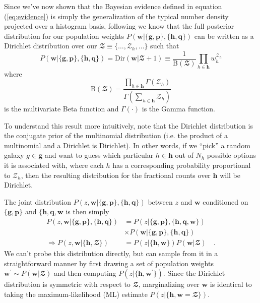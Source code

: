 \documentclass[a4paper,fleqn,usenatbib,english]{mnras}
\begin{document}
Since we've now shown that the Bayesian evidence defined in equation (\ref{eq:evidence}) is simply the generalization of the typical number density projected over a histogram basis, following \citep{leistedt+16} we know that the full posterior distribution for our population weights $P(\mathbf{w}|\lbrace \mathbf{g}, \mathbf{p} \rbrace, \lbrace \mathbf{h},\mathbf{q} \rbrace)$ can be written as a Dirichlet distribution over our $\mathbfcal{Z} \equiv \lbrace \ldots, \mathcal{Z}_h , \ldots \rbrace$ such that
\begin{equation}\label{eq:wh_pop}
P(\mathbf{w}|\lbrace \mathbf{g}, \mathbf{p} \rbrace, \lbrace \mathbf{h},\mathbf{q} \rbrace) = \textrm{Dir}(\mathbf{w}|\mathbfcal{Z}+1) \equiv \frac{1}{\textrm{B}(\mathbfcal{Z})} \prod_{h \in \mathbf{h}} w_h^{\mathcal{Z}_h}
\end{equation}
where
\begin{equation}
\textrm{B}(\mathbfcal{Z})=\frac{\prod_{h \in \mathbf{h}} \Gamma(\mathcal{Z}_h)}{\Gamma\left(\sum_{h \in \mathbf{h}} \mathcal{Z}_h \right)}
\end{equation}
is the multivariate Beta function and $\Gamma(\cdot)$ is the Gamma function.

To understand this result more intuitively, note that the Dirichlet distribution is the conjugate prior of the multinomial distribution (i.e. the product of a multinomial and a Dirichlet is Dirichlet). In other words, if we ``pick'' a random galaxy $g \in \mathbf{g}$ and want to guess which particular $h \in \mathbf{h}$ out of $N_h$ possible options it is associated with, where each $h$ has a corresponding probability proportional to $\mathcal{Z}_h$, then the resulting distribution for the fractional counts over $\mathbf{h}$ will be Dirichlet.

The joint distribution $P(z,\mathbf{w}|\lbrace \mathbf{g}, \mathbf{p} \rbrace, \lbrace \mathbf{h},\mathbf{q} \rbrace)$ between $z$ and $\mathbf{w}$ conditioned on $\lbrace \mathbf{g}, \mathbf{p} \rbrace$ and $\lbrace \mathbf{h}, \mathbf{q}, \mathbf{w}$ is then simply
\begin{align}
P(z,\mathbf{w}|\lbrace \mathbf{g}, \mathbf{p} \rbrace, \lbrace \mathbf{h},\mathbf{q} \rbrace) &= P(z|\lbrace \mathbf{g}, \mathbf{p} \rbrace, \lbrace \mathbf{h},\mathbf{q},\mathbf{w} \rbrace) \nonumber \\ 
&\times P(\mathbf{w}|\lbrace \mathbf{g},\mathbf{p} \rbrace, \lbrace \mathbf{h},\mathbf{q} \rbrace) \nonumber \\
\Rightarrow P(z,\mathbf{w}|\lbrace \mathbf{h},\mathbfcal{Z} \rbrace) &= P(z|\lbrace \mathbf{h}, \mathbf{w} \rbrace) P(\mathbf{w}|\mathbfcal{Z}) \quad .
\end{align}
We can't probe this distribution directly, but can sample from it in a straightforward manner by first drawing a set of population weights $\mathbf{w}^\prime \sim P(\mathbf{w}|\mathbfcal{Z})$ and then computing $P(z|\lbrace \mathbf{h},\mathbf{w}^\prime \rbrace)$. Since the Dirichlet distribution is symmetric with respect to $\mathbfcal{Z}$, marginalizing over $\mathbf{w}$ is identical to taking the maximum-likelihood (ML) estimate $P(z|\lbrace \mathbf{h},\mathbf{w}=\mathbfcal{Z} \rbrace)$.
\end{document}
